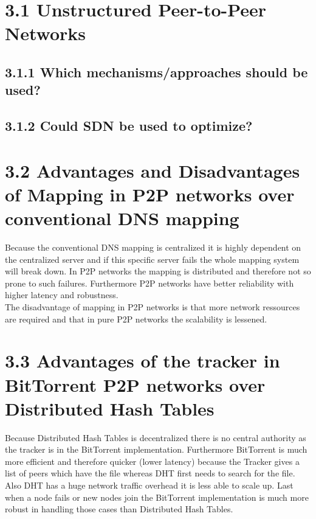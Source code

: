 \documentclass{article}
\begin{document}
	\pagestyle{fancy}
	\hfill
	
	\section*{3.1 Unstructured Peer-to-Peer Networks}
	\begin{adjustwidth}{2em}{2em}
		\subsection*{3.1.1 Which mechanisms/approaches should be used?}
		\begin{adjustwidth}{2em}{2em}
		\end{adjustwidth}
		\subsection*{3.1.2 Could SDN be used to optimize?}
		\begin{adjustwidth}{2em}{2em}
		\end{adjustwidth}
	\end{adjustwidth}
	
	\section*{3.2 Advantages and Disadvantages of Mapping in P2P networks over conventional DNS mapping}
	\begin{adjustwidth}{2em}{2em}
		Because the conventional DNS mapping is centralized it is highly dependent on the centralized server and if this specific server fails the whole mapping system will break down. In P2P networks the mapping is distributed and therefore not so prone to such failures. Furthermore P2P networks have better reliability with higher latency and robustness. \\
		The disadvantage of mapping in P2P networks is that more network ressources are required and that in pure P2P networks the scalability is lessened.
	\end{adjustwidth}
	
	\section*{3.3 Advantages of the tracker in BitTorrent P2P networks over Distributed Hash Tables}
	\begin{adjustwidth}{2em}{2em}
		Because Distributed Hash Tables is decentralized there is no central authority as the tracker is in the BitTorrent implementation. Furthermore BitTorrent is much more efficient and therefore quicker (lower latency) because the Tracker gives a list of peers which have the file whereas DHT first needs to search for the file. Also DHT has a huge network traffic overhead it is less able to scale up. Last when a node fails or new nodes join the BitTorrent implementation is much more robust in handling those cases than Distributed Hash Tables.
	\end{adjustwidth}
	
\end{document}
